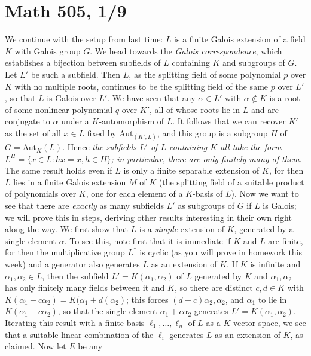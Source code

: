 \documentclass[10pt]{article}
\begin{document}
\section*{Math 505, 1/9}

We continue with the setup from last time: $L$ is a finite Galois
extension of a field $K$ with Galois group $G$. We head towards the {\sl
  Galois correspondence}, which establishes a bijection between
subfields of $L$ containing $K$ and subgroups of $G$. Let $L'$ be such a
subfield. Then $L$, as the splitting field of some polynomial $p$ over
$K$ with no multiple roots, continues to be the splitting field of the
same $p$ over $L'$, so that $L$ is Galois over $L'$. We have seen that
any $\alpha\in L'$ with $\alpha\notin K$ is a root of some nonlinear
polynomial $q$ over $K'$, all of whose roots lie in $L$ and are
conjugate to $\alpha$ under a $K$-automorphism of $L$. It follows that
we can recover $K'$ as the set of all $x\in L$ fixed by Aut$_(K',L)$,
and this group is a subgroup $H$ of $G=$Aut$_K(L)$. Hence {\sl the
  subfields $L'$ of $L$ containing $K$ all take the form $L^H = \{x\in
  L: hx = x, h\in H\}$; in particular, there are only finitely many of
  them}. The same result holds even if $L$ is only a finite separable
extension of $K$, for then $L$ lies in a finite Galois extension $M$ of
$K$ (the splitting field of a suitable product of polynomials over $K$,
one for each element of a $K$-basis of $L$). Now we want to see that
there are {\sl exactly} as many subfields $L'$ as subgroups of $G$ if
$L$ is Galois; we will prove this in steps, deriving other results
interesting in their own right along the way. We first show that $L$ is
a {\sl simple} extension of $K$, generated by a single element $\alpha$.
To see this, note first that it is immediate if $K$ and $L$ are finite,
for then the multiplicative group $L^*$ is cyclic (as you will prove in
homework this week) and a generator also generates $L$ as an extension
of $K$. If $K$ is infinite and $\alpha_1,\alpha_2\in L$, then the
subfield $L'=K(\alpha_1,\alpha_2)$ of $L$ generated by $K$ and
$\alpha_1,\alpha_2$ has only finitely many fields between it and $K$, so
there are distinct $c,d\in K$ with $K(\alpha_1+c\alpha_2) =
K(\alpha_1+d(\alpha_2)$; this forces $(d-c)\alpha_2,\alpha_2$, and
$\alpha_1$ to lie in $K(\alpha_1+c\alpha_2)$, so that the single element
$\alpha_1+c\alpha_2$ generates $L'=K(\alpha_1,\alpha_2)$. Iterating this
result with a finite basis $\ell_1,\ldots,\ell_n$ of $L$ as a $K$-vector
space, we see that a suitable linear combination of the $\ell_i$
generates $L$ as an extension of $K$, as claimed. Now let $E$ be any
\end{document}
